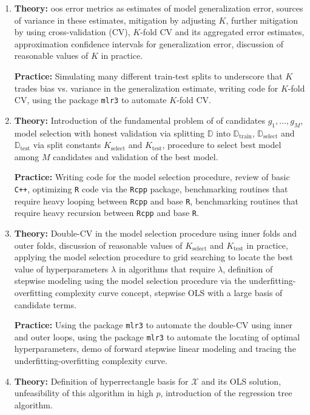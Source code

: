 \begin{enumerate}[(1)]
\item \textbf{Theory:} oos error metrics as estimates of model generalization error, sources of variance in these estimates, mitigation by adjusting $K$, further mitigation by using cross-validation (CV), $K$-fold CV and its aggregated error estimates, approximation confidence intervals for generalization error, discussion of reasonable values of $K$ in practice.

\textbf{Practice:} Simulating many different train-test splits to underscore that $K$ trades bias vs. variance in the generalization estimate, writing code for $K$-fold CV, using the package \texttt{mlr3} to automate $K$-fold CV.

\item \textbf{Theory:} Introduction of the fundamental problem of  of candidates $g_1, \ldots, g_M$, model selection with honest validation via splitting $\mathbb{D}$ into $\mathbb{D}_{\text{train}}$, $\mathbb{D}_{\text{select}}$ and $\mathbb{D}_{\text{test}}$ via split constants $K_{\text{select}}$ and $K_{\text{test}}$, procedure to select best model among $M$ candidates and validation of the best model.

\textbf{Practice:} Writing code for the model selection procedure, review of basic \texttt{C++}, optimizing \texttt{R} code via the \texttt{Rcpp} package, benchmarking routines that require heavy looping between \texttt{Rcpp} and base \texttt{R}, benchmarking routines that require heavy recursion between \texttt{Rcpp} and base \texttt{R}.

\item \textbf{Theory:} Double-CV in the model selection procedure using inner folds and outer folds, discussion of reasonable values of $K_{\text{select}}$ and $K_{\text{test}}$ in practice, applying the model selection procedure to grid searching to locate the best value of hyperparameters $\lambda$ in algorithms that require $\lambda$, definition of stepwise modeling using the model selection procedure via the underfitting-overfitting complexity curve concept, stepwise OLS with a large basis of candidate terms. 

\textbf{Practice:} Using the package \texttt{mlr3} to automate the double-CV using inner and outer loops, using the package \texttt{mlr3} to automate the locating of optimal hyperparameters, demo of forward stepwise linear modeling and tracing the underfitting-overfitting complexity curve.

\item \textbf{Theory:} Definition of hyperrectangle basis for $\mathcal{X}$ and its OLS solution, unfeasibility of this algorithm in high $p$, introduction of the regression tree algorithm.


\end{enumerate}
